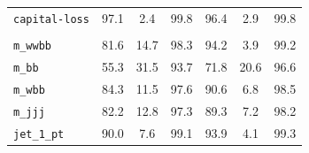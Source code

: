 \begin{table}[htbp]
\begin{tabular}{@{}l ccc ccc@{}}
\texttt{capital-loss} & 97.1 & 2.4 & 99.8 & 96.4 & 2.9 & 99.8 \\
\addlinespace[3pt]
\multicolumn{7}{@{}l}{\textit{HIGGS}} \\
\texttt{m\_wwbb} & 81.6 & 14.7 & 98.3 & 94.2 & 3.9 & 99.2 \\
\texttt{m\_bb} & 55.3 & 31.5 & 93.7 & 71.8 & 20.6 & 96.6 \\
\texttt{m\_wbb} & 84.3 & 11.5 & 97.6 & 90.6 & 6.8 & 98.5 \\
\texttt{m\_jjj} & 82.2 & 12.8 & 97.3 & 89.3 & 7.2 & 98.2 \\
\texttt{jet\_1\_pt} & 90.0 & 7.6 & 99.1 & 93.9 & 4.1 & 99.3 \\
\bottomrule
\end{tabular}
\end{table}
